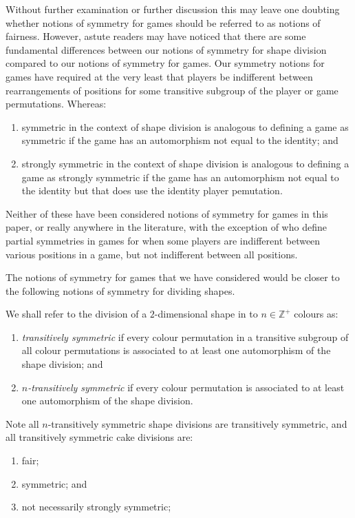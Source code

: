 Without further examination or further discussion this may leave one doubting whether notions of symmetry for games should be referred to as notions of fairness. However, astute readers may have noticed that there are some fundamental differences between our notions of symmetry for shape division compared to our notions of symmetry for games. Our symmetry notions for games have required at the very least that players be indifferent between rearrangements of positions for some transitive subgroup of the player or game permutations. Whereas:
\begin{enumerate}
	\item symmetric in the context of shape division is analogous to defining a game as symmetric if the game has an automorphism not equal to the identity; and
	\item strongly symmetric in the context of shape division is analogous to defining a game as strongly symmetric if the game has an automorphism not equal to the identity but that does use the identity player pemutation.
\end{enumerate}

Neither of these have been considered notions of symmetry for games in this paper, or really anywhere in the literature, with the exception of \cite{tohme2019structural} who define partial symmetries in games for when some players are indifferent between various positions in a game, but not indifferent between all positions. 

The notions of symmetry for games that we have considered would be closer to the following notions of symmetry for dividing shapes. 

\begin{definition}
	We shall refer to the division of a $2$-dimensional shape in to $n \in \mathbb{Z}^+$ colours as:
	\begin{enumerate}
		\item \textit{transitively symmetric} if every colour permutation in a transitive subgroup of all colour permutations is associated to at least one automorphism of the shape division; and
		\item \textit{$n$-transitively symmetric} if every colour permutation is associated to at least one automorphism of the shape division.
	\end{enumerate}
\end{definition}

Note all $n$-transitively symmetric shape divisions are transitively symmetric, and all transitively symmetric cake divisions are:
\begin{enumerate}
	\item fair;
	\item symmetric; and
	\item not necessarily strongly symmetric;
\end{enumerate}

